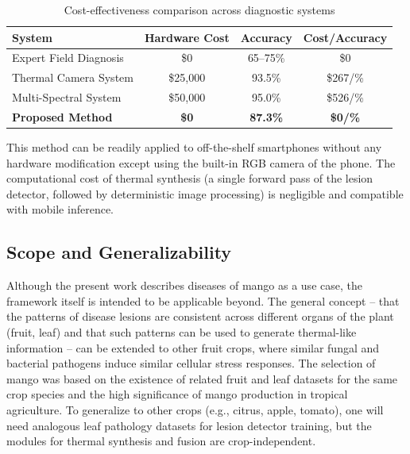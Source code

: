 \documentclass[utf8]{FrontiersinHarvard} %
\begin{document}
\begin{table}[!ht]
    \centering
    \caption{Cost-effectiveness comparison across diagnostic systems}
    \label{tab:cost}
    \footnotesize
    \begin{tabular}{lccc}
        \toprule
        \textbf{System} & \textbf{Hardware Cost} & \textbf{Accuracy} & \textbf{Cost/Accuracy} \\
        \midrule
        Expert Field Diagnosis & \$0 & 65--75\% & \$0 \\
        Thermal Camera System & \$25,000 & 93.5\% & \$267/\% \\
        Multi-Spectral System & \$50,000 & 95.0\% & \$526/\% \\
        \textbf{Proposed Method} & \textbf{\$0} & \textbf{87.3\%} & \textbf{\$0/\%} \\
        \bottomrule
    \end{tabular}
\end{table}
This method can be readily applied to off-the-shelf smartphones without any hardware modification except using the built-in RGB camera of the phone. The computational cost of thermal synthesis (a single forward pass of the lesion detector, followed by deterministic image processing) is negligible and compatible with mobile inference. 

\subsection{Scope and Generalizability}
Although the present work describes diseases of mango as a use case, the framework itself is intended to be applicable beyond. The general concept – that the patterns of disease lesions are consistent across different organs of the plant (fruit, leaf) and that such patterns can be used to generate thermal-like information – can be extended to other fruit crops, where similar fungal and bacterial pathogens induce similar cellular stress responses. The selection of mango was based on the existence of related fruit and leaf datasets for the same crop species and the high significance of mango production in tropical agriculture. To generalize to other crops (e.g., citrus, apple, tomato), one will need analogous leaf pathology datasets for lesion detector training, but the modules for thermal synthesis and fusion are crop-independent. 

\begingroup\color{blue}
\end{document}
